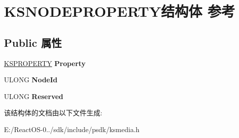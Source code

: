\hypertarget{struct_k_s_n_o_d_e_p_r_o_p_e_r_t_y}{}\section{K\+S\+N\+O\+D\+E\+P\+R\+O\+P\+E\+R\+T\+Y结构体 参考}
\label{struct_k_s_n_o_d_e_p_r_o_p_e_r_t_y}
\subsection*{Public 属性}
\begin{DoxyCompactItemize}
\item 
\mbox{\label{struct_k_s_n_o_d_e_p_r_o_p_e_r_t_y_a26945962aee6c686cd0c6963c3a157b4}} 
\hyperlink{struct_k_s_i_d_e_n_t_i_f_i_e_r}{K\+S\+P\+R\+O\+P\+E\+R\+TY} {\bfseries Property}
\item 
\mbox{\label{struct_k_s_n_o_d_e_p_r_o_p_e_r_t_y_a1d726bf8fc108f42eac69b2e700a4a5e}} 
U\+L\+O\+NG {\bfseries Node\+Id}
\item 
\mbox{\label{struct_k_s_n_o_d_e_p_r_o_p_e_r_t_y_aa4e8e25e0bebd3dfcb0d4a79524e33fd}} 
U\+L\+O\+NG {\bfseries Reserved}
\end{DoxyCompactItemize}


该结构体的文档由以下文件生成\+:\begin{DoxyCompactItemize}
\item 
E\+:/\+React\+O\+S-\/0../sdk/include/psdk/ksmedia.\+h\end{DoxyCompactItemize}
